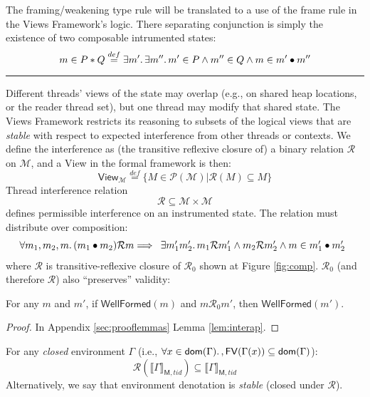 The framing/weakening type rule will be translated to a use of the frame rule in the Views Framework's logic.  There separating conjunction is simply the existence of two composable intrumented states:
\[ m \in P \ast Q   \stackrel{def}{=} \exists m' \ldotp \exists m'' \ldotp m' \in P \land m'' \in Q \land m \in m' \bullet m''\]
\hrule
Different threads' views of the state may overlap (e.g., on shared heap locations, or the reader thread set), but one thread may modify that shared state.  The Views Framework restricts its reasoning to subsets of the logical views that are \emph{stable} with respect to expected interference from other threads or contexts.  We define the interference as (the transitive reflexive closure of) a binary relation $\mathcal{R}$ on $\mathcal{M}$, and a \textsf{View} in the formal framework is then:
\[\textsf{View}_{\mathcal{M}} \stackrel{def}{=} \{ M \in \mathcal{P}(\mathcal{M}) | \mathcal{R}(M) \subseteq M\}\]
Thread interference relation
\[\mathcal{R} \subseteq \mathcal{M} \times \mathcal{M}\]  defines permissible interference on an instrumented state. The relation must distribute over composition:
\[ \forall m_{1}, m_{2}, m\ldotp (m_{1} \bullet  m_{2})\mathcal{R}m \Longrightarrow \begin{array}{ll}  \exists  m'_{1} m'_{2} \ldotp m_{1} \mathcal{R} m'_{1} \land m_{2} \mathcal{R} m'_{2} \land  m \in m'_{1} \bullet m'_{2} \end{array}\]
where $\mathcal{R}$ is transitive-reflexive closure of $\mathcal{R}_{0}$ shown at Figure \ref{fig:comp}. $\mathcal{R}_0$ (and therefore $\mathcal{R}$) also ``preserves'' validity:
\begin{lemma}\label{lem:inter}
For any $m$ and $m'$, if $\mathsf{WellFormed}(m)$ and $m\mathcal{R}_0m'$, then $\mathsf{WellFormed}(m')$.
\end{lemma}
\begin{proof}
In Appendix \ref{sec:prooflemmas} Lemma \ref{lem:interap}.
\end{proof}
\begin{lemma}\label{lemma:stblw}
For any \emph{closed} environment $\Gamma$ (i.e., $\forall x\in\mathsf{dom}(\Gamma)\ldotp, \mathsf{FV}(\Gamma(x))\subseteq\mathsf{dom}(\Gamma)$):
\[
\mathcal{R}(\llbracket\Gamma\rrbracket_{\mathsf{M},tid})\subseteq\llbracket\Gamma\rrbracket_{\mathsf{M},tid}
\]
Alternatively, we say that environment denotation is \emph{stable} (closed under $\mathcal{R}$).
\end{lemma}

